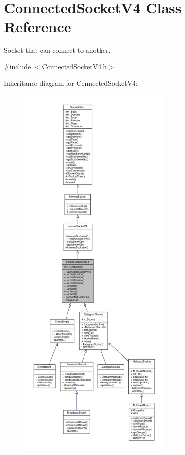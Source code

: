 \hypertarget{classConnectedSocketV4}{}\section{Connected\+Socket\+V4 Class Reference}
\label{classConnectedSocketV4}


Socket that can connect to another.  




{\ttfamily \#include $<$Connected\+Socket\+V4.\+h$>$}



Inheritance diagram for Connected\+Socket\+V4\+:\nopagebreak
\begin{figure}[H]
\begin{center}
\leavevmode
\includegraphics[height=550pt]{classConnectedSocketV4__inherit__graph}
\end{center}
\end{figure}
